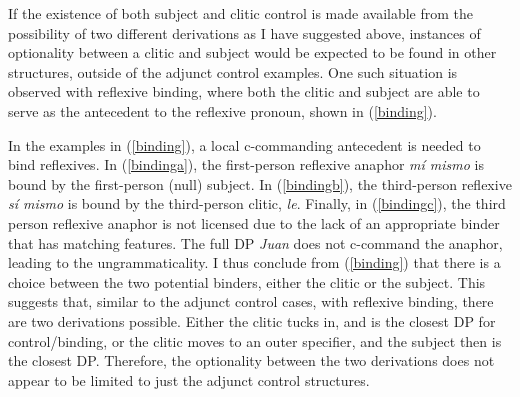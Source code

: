\documentclass[output=paper,colorlinks,citecolor=brown]{langscibook}
\begin{document}
If the existence of both subject and clitic control is made available from the possibility of two different derivations as I have suggested above, instances of optionality between a clitic and subject would be expected to be found in other structures, outside of the adjunct control examples. One such situation is observed with reflexive binding, where both the clitic and subject are able to serve as the antecedent to the reflexive pronoun, shown in (\ref{binding}).
\ea \label{binding}
\label{bindinga}
\label{bindingb}
\label{bindingc}
\z
\z

In the examples in (\ref{binding}), a local c-commanding antecedent is needed to bind reflexives. In (\ref{bindinga}), the first-person reflexive anaphor \textit{mí mismo} is bound by the first-person (null) subject. In (\ref{bindingb}), the third-person reflexive \textit{sí mismo} is bound by the third-person clitic, \textit{le}. Finally, in (\ref{bindingc}), the third person reflexive anaphor is not licensed due to the lack of an appropriate binder that has matching features. The full DP \textit{Juan} does not c-command the anaphor, leading to the ungrammaticality. I thus conclude from (\ref{binding}) that there is a choice between the two potential binders, either the clitic or the subject. This suggests that, similar to the adjunct control cases, with reflexive binding, there are two derivations possible. Either the clitic tucks in, and is the closest DP for control/binding, or the clitic moves to an outer specifier, and the subject then is the closest DP. Therefore, the optionality between the two derivations does not appear to be limited to just the adjunct control structures.
\end{document}
